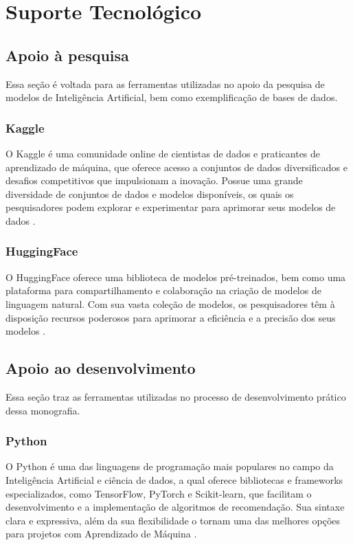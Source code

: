 \chapter[Suporte Tecnológico]{Suporte Tecnológico}

\section{Apoio à pesquisa}\label{sec:apoiopesquisa}
Essa seção é voltada para as ferramentas utilizadas no apoio da pesquisa de modelos de Inteligência Artificial, bem
como exemplificação de bases de dados.

\subsection{Kaggle}\label{subsec:kaggle}
O Kaggle é uma comunidade online de cientistas de dados e praticantes de aprendizado de máquina, que 
oferece acesso a conjuntos de dados diversificados e desafios competitivos que impulsionam a inovação. Possue 
uma grande diversidade de conjuntos de dados e modelos disponíveis, os quais os pesquisadores podem explorar e 
experimentar para aprimorar seus modelos de dados \cite{kagglesite}.

\subsection{HuggingFace}\label{subsec:huggingface}
O HuggingFace oferece uma biblioteca de modelos pré-treinados, bem como uma plataforma para compartilhamento e 
colaboração na criação de modelos de linguagem natural. Com sua vasta coleção de modelos, os pesquisadores têm à 
disposição recursos poderosos para aprimorar a eficiência e a precisão dos seus modelos \cite{huggingsite}.

\section{Apoio ao desenvolvimento}\label{sec:apoiodev}
Essa seção traz as ferramentas utilizadas no processo de desenvolvimento prático dessa monografia.

\subsection{Python}\label{subsec:python}
O Python é uma das linguagens de programação mais populares no campo da Inteligência Artificial e ciência de dados, a 
qual oferece bibliotecas e frameworks especializados, como TensorFlow, PyTorch e Scikit-learn, que facilitam o 
desenvolvimento e a implementação de algoritmos de recomendação. Sua sintaxe clara e expressiva, além da sua flexibilidade 
o tornam uma das melhores opções para projetos com Aprendizado de Máquina \cite{pythonsite}.

